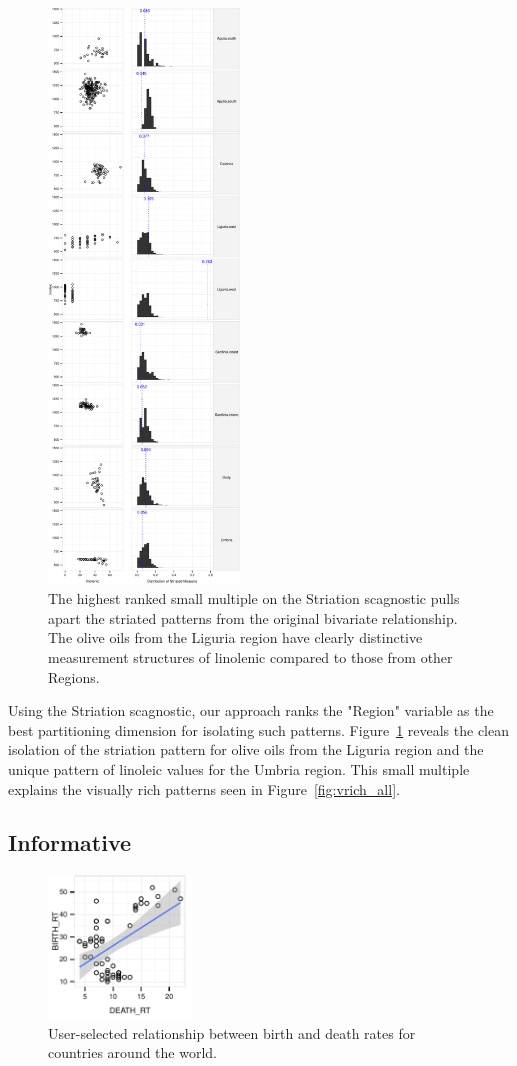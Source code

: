 \begin{figure}
 \centering 
\includegraphics[width=2in]{images/15_2321946775352-region.pdf}
  \caption{The highest ranked small multiple on the Striation scagnostic pulls apart the striated patterns from the original bivariate relationship. The olive oils from the Liguria region have clearly distinctive measurement structures of linolenic compared to those from other Regions.}
 \label{fig:vrich_sm}
\end{figure}
Using the Striation scagnostic, our approach ranks the "Region" variable as the best partitioning dimension for isolating such patterns. Figure~\ref{fig:vrich_sm} reveals the clean isolation of the striation pattern for olive oils from the Liguria region and the unique pattern of linoleic values for the Umbria region. This small multiple explains the visually rich patterns seen in Figure~\ref{fig:vrich_all}.

\subsection{Informative}

\begin{figure}
 \centering 
\includegraphics[width=1.5in]{images/DEATH_RT-BIRTH_RT.pdf}
  \caption{User-selected relationship between birth and death rates for countries around the world.}
 \label{fig:informative_all}
\end{figure}


